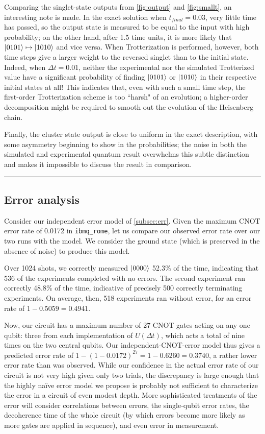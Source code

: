 \documentclass[10pt]{amsart}
\theoremstyle{definition}
\newcommand\separator{\vspace{1em}\hrule \vspace{1em}}
\begin{document}
Comparing the singlet-state outputs from \cref{fig:output} and
\cref{fig:smallt}, an interesting note is made. In the exact solution when
$t_{final} = 0.03$, very little time has passed, so the output state is 
measured to be equal to the input with high probability; on the other hand,
after 1.5 time units, it is more likely that $\ket{0101} \mapsto \ket{1010}$ and
vice versa. When Trotterization is performed, however, both time steps give a
larger weight to the reversed singlet than to the initial state. Indeed, when
$\Delta t = 0.01$, neither the experimental nor the simulated Trotterized value
have a significant probability of finding $\ket{0101}$ or $\ket{1010}$ in their
respective initial states at all! This indicates that, even with such a small
time step, the first-order Trotterization scheme is too ``harsh" of an
evolution; a higher-order decomposition might be required to smooth out the
evolution of the Heisenberg chain.

Finally, the cluster state output is close to uniform in the exact description,
with some asymmetry beginning to show in the probabilities; the noise in both
the simulated and experimental quantum result overwhelms this subtle distinction
and makes it impossible to discuss the result in comparison.

\separator


\subsection{Error analysis} \label{subsec:truerr}

Consider our independent error model of \cref{subsec:err}. Given the maximum
CNOT error rate of 0.0172 in \texttt{ibmq\_rome}, let us compare our observed
error rate over our two runs with the model. We consider the ground state (which
is preserved in the absence of noise) to produce this model.

Over 1024 shots, we correctly measured $\ket{0000}$ 52.3\% of the time,
indicating that 536 of the experiments completed with no errors. The second
experiment ran correctly 48.8\% of the time, indicative of precisely 500
correctly terminating experiments. On average, then, 518 experiments ran
without error, for an error rate of $1 - 0.5059 = 0.4941$.

Now, our circuit has a maximum number of 27 CNOT gates acting on any one qubit:
three from each implementation of $U(\Delta t)$, which acts a total of nine
times on the two central qubits. Our independent-CNOT-error model thus gives
a predicted error rate of $1 - (1 - 0.0172)^{27} = 1 - 0.6260 = 0.3740$, a
rather lower error rate than was observed. While our confidence in the actual
error rate of our circuit is not very high given only two trials, the
discrepancy is large enough that the highly na\"ive error model we propose is
probably not sufficient to characterize the error in a circuit of even modest
depth. More sophisticated treatments of the error will consider correlations
between errors, the single-qubit error rates, the decoherence time of the whole
circuit (by which errors become more likely as more gates are applied in
sequence), and even error in measurement.
\end{document}
